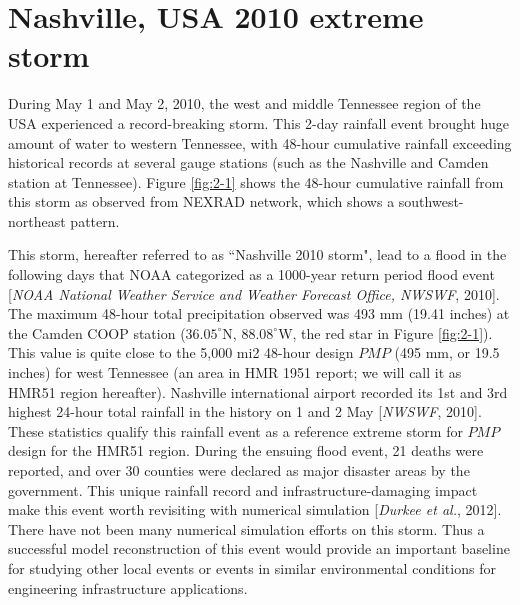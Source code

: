  
\section{Nashville, USA 2010 extreme storm}
 
During May 1 and May 2, 2010, the west and middle Tennessee region of the USA experienced a record-breaking storm. This 2-day rainfall event brought huge amount of water to western Tennessee, with 48-hour cumulative rainfall exceeding historical records at several gauge stations (such as the Nashville and Camden station at Tennessee). Figure \ref{fig:2-1} shows the 48-hour cumulative rainfall from this storm as observed from NEXRAD network, which shows a southwest-northeast pattern.

This storm, hereafter referred to as ``Nashville 2010 storm", lead to a flood in the following days that NOAA categorized as a 1000-year return period flood event [\textit{NOAA National Weather Service and Weather Forecast Office, NWSWF}, 2010]. The maximum 48-hour total precipitation observed was 493 mm (19.41 inches) at the Camden COOP station ($36.05^{\circ}$N, $88.08^{\circ}$W, the red star in Figure \ref{fig:2-1}). This value is quite close to the 5,000 mi2 48-hour design $PMP$ (495 mm, or 19.5 inches) for west Tennessee (an area in HMR 1951 report; we will call it as HMR51 region hereafter). Nashville international airport recorded its 1st and 3rd highest 24-hour total rainfall in the history on 1 and 2 May [\textit{NWSWF}, 2010]. These statistics qualify this rainfall event as a reference extreme storm for $PMP$ design for the HMR51 region. During the ensuing flood event, 21 deaths were reported, and over 30 counties were declared as major disaster areas by the government. This unique rainfall record and infrastructure-damaging impact make this event worth revisiting with numerical simulation [\textit{Durkee et al.}, 2012]. There have not been many numerical simulation efforts on this storm. Thus a successful model reconstruction of this event would provide an important baseline for studying other local events or events in similar environmental conditions for engineering infrastructure applications.


